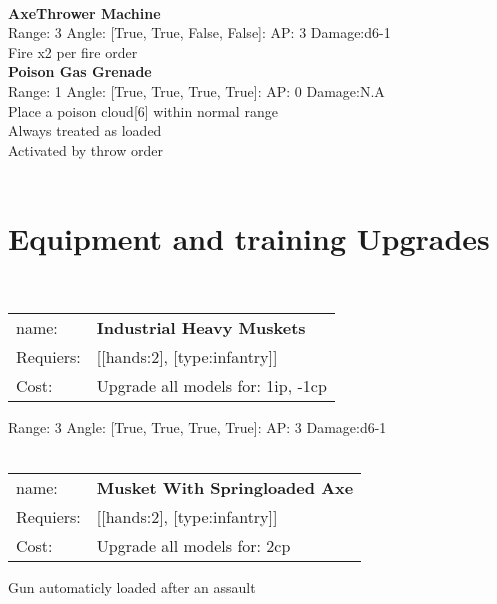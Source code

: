 \ \\
{\bf AxeThrower Machine } \\



Range: 3  Angle: [True, True, False, False]: AP: 3 Damage:d6-1 \\
Fire x2 per fire order\\ 




{\bf Poison Gas Grenade } \\



Range: 1  Angle: [True, True, True, True]: AP: 0 Damage:N.A \\
Place a poison cloud[6] within normal range\\ 
Always treated as loaded\\ 
Activated by throw order\\ 




 
\ \\

\section{Equipment and training Upgrades}\ \\
\begin{tabular}{ll}
name: & {\bf Industrial Heavy Muskets } \\
Requiers: & [[hands:2], [type:infantry]] \\
Cost: & Upgrade all models for: 1ip, -1cp \\
\end{tabular}



Range: 3  Angle: [True, True, True, True]: AP: 3 Damage:d6-1 \\








\ \\
\begin{tabular}{ll}
name: & {\bf Musket With Springloaded Axe } \\
Requiers: & [[hands:2], [type:infantry]] \\
Cost: & Upgrade all models for: 2cp \\
\end{tabular}

Gun automaticly loaded after an assault\\ 


